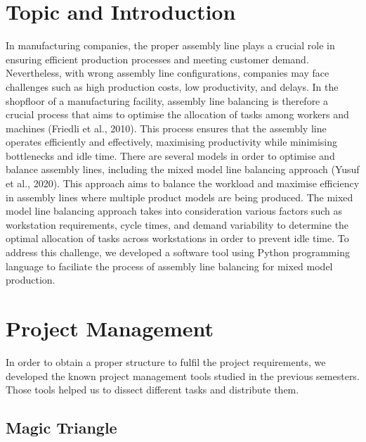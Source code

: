 \pagestyle{fancy}

\section{Topic and Introduction}
\label{sec:Topic_and_Introduction}
In manufacturing companies, the proper assembly line plays a crucial role in ensuring efficient production processes and meeting customer demand. Nevertheless, with wrong assembly line configurations, companies may face challenges such as high production costs, low productivity, and delays. In the shopfloor of a manufacturing facility, assembly line balancing is therefore a crucial process that aims to optimise the allocation of tasks among workers and machines (Friedli et al., 2010). This process ensures that the assembly line operates efficiently and effectively, maximising productivity while minimising bottlenecks and idle time. There are several models in order to optimise and balance assembly lines, including the mixed model line balancing approach (Yusuf et al., 2020). This approach aims to balance the workload and maximise efficiency in assembly lines where multiple product models are being produced. The mixed model line balancing approach takes into consideration various factors such as workstation requirements, cycle times, and demand variability to determine the optimal allocation of tasks across workstations in order to prevent idle time. To address this challenge, we developed a software tool using Python programming language to faciliate the process of assembly line balancing for mixed model production. 

\section{Project Management}
In order to obtain a proper structure to fulfil the project requirements, we developed the known project management tools studied in the previous semesters. Those tools helped us to dissect different tasks and distribute them.

\subsection{Magic Triangle}
